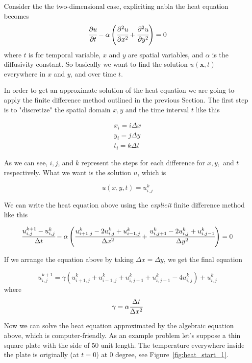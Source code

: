 Consider the the two-dimensional case, expliciting nabla the heat equation becomes
\begin{equation}
\cfrac{\partial u}{\partial t} - \alpha\left(\cfrac{\partial^2 u}{\partial x^2}+\cfrac{\partial^2 u}{\partial y^2}\right)= 0
\end{equation}
\noindent
where $t$ is for temporal variable, $x$ and $y$ are spatial variables, and $\alpha$ is the diffusivity constant. So basically we want to find the solution $u(\mathbf{x}, t)$ everywhere in $x$ and $y$, and over time $t$.

In order to get an approximate solution of the heat equation we are going to apply the finite difference method outlined in the previous Section. The first step is to "discretize" the spatial domain $x, y$ and the time interval $t$ like this

\begin{gather}
x_i = i\Delta x \\
y_i = j\Delta y \\
t_i = k\Delta t 
\end{gather}

As we can see, $i, j$, and $k$ represent the steps for each difference for $x, y,$ and $t$ respectively. What we want is the solution $u$, which is

\begin{equation}
u(x, y, t) = u_{i,j}^k
\end{equation}

We can write the heat equation above using the \emph{explicit} finite difference method like this

\begin{equation}
\cfrac{u_{i,j}^{k+1}-u_{i,j}^k}{\Delta t} - \alpha\left(\cfrac{u_{i+1,j}^{k}-2u_{i,j}^{k}+u_{i-1,j}^{k}}{\Delta x^2}+\cfrac{u_{i,j+1}^{k}-2u_{i,j}^{k}+u_{i,j-1}^{k}}{\Delta y^2}\right)=0
\end{equation}

If we arrange the equation above by taking $\Delta x = \Delta y$, we get the final equation

\begin{equation}
u_{i,j}^{k+1} = \gamma \left(u_{i+1,j}^{k}+u_{i-1,j}^{k}+u_{i,j+1}^{k}+u_{i,j-1}^{k}-4u_{i,j}^{k}\right)+u_{i,j}^{k}
\end{equation}
\noindent 
where
\begin{equation}
\gamma = \alpha\cfrac{\Delta t}{\Delta x^2}
\end{equation}

Now we can solve the heat equation approximated by the algebraic equation above, which is computer-friendly. As an example problem let’s suppose a thin square plate with the side of 50 unit length. The temperature everywhere inside the plate is originally (at $t = 0$) at 0 degree, see Figure~\ref{fig:heat_start_1}.

